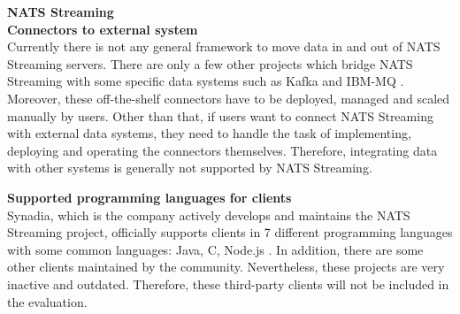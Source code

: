 \large \textbf{NATS Streaming}\\
\normalsize
\textbf{Connectors to external system}\\
Currently there is not any general framework to move data in and out of NATS Streaming servers. There are only a few other projects which bridge NATS Streaming with some specific data systems such as Kafka and IBM-MQ \cite{natsclientsconnectors}. Moreover, these off-the-shelf connectors have to be deployed, managed and scaled manually by users. Other than that, if users want to connect NATS Streaming with external data systems, they need to handle the task of implementing, deploying and operating the connectors themselves. Therefore, integrating data with other systems is generally not supported by NATS Streaming. 

\textbf{Supported programming languages for clients}\\
Synadia, which is the company actively develops and maintains the NATS Streaming project, officially supports clients in 7 different programming languages with some common languages: Java, C, Node.js \cite{natsclientsconnectors}. In addition, there are some other clients maintained by the community. Nevertheless, these projects are very inactive and outdated. Therefore, these third-party clients will not be included in the evaluation.      

